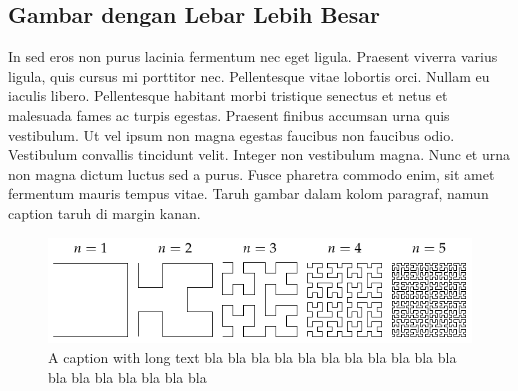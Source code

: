 \documentclass{article}
\begin{document}
\subsection{Gambar dengan Lebar Lebih Besar}
In sed eros non purus lacinia fermentum nec eget ligula. Praesent viverra varius ligula, quis cursus mi porttitor nec. Pellentesque vitae lobortis orci. Nullam eu iaculis libero. Pellentesque habitant morbi tristique senectus et netus et malesuada fames ac turpis egestas. Praesent finibus accumsan urna quis vestibulum. Ut vel ipsum non magna egestas faucibus non faucibus odio. Vestibulum convallis tincidunt velit. Integer non vestibulum magna. Nunc et urna non magna dictum luctus sed a purus. Fusce pharetra commodo enim, sit amet fermentum mauris tempus vitae. 
Taruh gambar dalam kolom paragraf, namun caption taruh di margin kanan.

\begin{figure}[!h]\centering
\includegraphics[scale = 1.08]{gambar/hilbertcurves}
\caption{\footnotesize A caption with long text bla bla bla bla
  bla bla bla bla bla bla bla bla bla bla bla bla bla bla}
\end{figure}
\end{document}
